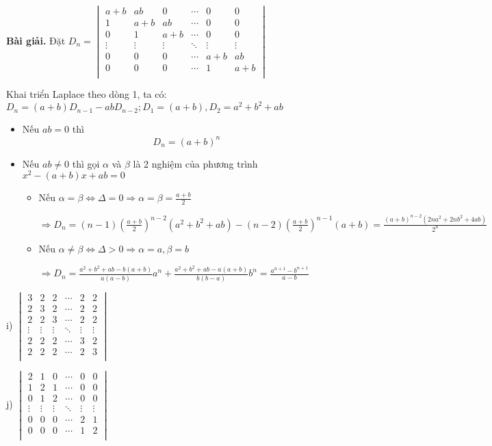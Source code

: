 \documentclass[12pt]{report}
\begin{document}
\textbf{Bài giải.} Đặt $D_n = \begin{vmatrix}
	a+b & ab & 0 & \cdots & 0 & 0 \\
	1 & a+b & ab & \cdots & 0 & 0 \\
	0 & 1 & a+b & \cdots & 0 & 0 \\
	\vdots & \vdots & \vdots & \ddots & \vdots & \vdots \\
	0 & 0 & 0 & \cdots & a+b & ab \\
	0 & 0 & 0 & \cdots & 1 & a+b \\
\end{vmatrix}$

Khai triển Laplace theo dòng 1, ta có: $D_n = (a+b)D_{n-1} - ab D_{n-2}; D_1 = (a+b), D_2 = a^2+b^2+ab$

\begin{itemize}
	\item Nếu $ab = 0$ thì \[ D_n = (a+b)^n \]
	\item Nếu $ab \neq 0$ thì gọi $\alpha$ và $\beta$ là 2 nghiệm của phương trình $x^2 - (a+b)x + ab = 0$
	\begin{itemize}
		\item Nếu $\alpha = \beta \Leftrightarrow \Delta = 0 \Rightarrow \alpha = \beta = \frac{a+b}{2}$ 
		
		$\Rightarrow D_n = (n-1) \left( \frac{a+b}{2} \right)^{n-2} (a^2+b^2+ab) - (n-2) \left(\frac{a+b}{2}\right)^{n-1} (a+b) = \frac{(a+b)^{n-2}(2na^2+2nb^2+4ab)}{2^n}$
		
		\item Nếu $\alpha \neq \beta \Leftrightarrow \Delta > 0 \Rightarrow \alpha = a, \beta = b$
		
		$\Rightarrow D_n = \frac{a^2+b^2+ab - b(a+b)}{a(a-b)} a^n + \frac{a^2+b^2+ab - a(a+b)}{b(b-a)} b^n = \frac{a^{n+1} - b^{n+1}}{a-b}$
	\end{itemize}
\end{itemize}

i) $\begin{vmatrix}
	3 & 2 & 2 & \cdots & 2 & 2 \\
	2 & 3 & 2 & \cdots & 2 & 2 \\
	2 & 2 & 3 & \cdots & 2 & 2 \\
	\vdots & \vdots & \vdots & \ddots & \vdots & \vdots \\
	2 & 2 & 2 & \cdots & 3 & 2 \\
	2 & 2 & 2 & \cdots & 2 & 3 \\
\end{vmatrix}$

j) $\begin{vmatrix}
	2 & 1 & 0 & \cdots & 0 & 0 \\
	1 & 2 & 1 & \cdots & 0 & 0 \\
	0 & 1 & 2 & \cdots & 0 & 0 \\
	\vdots & \vdots & \vdots & \ddots & \vdots & \vdots \\
	0 & 0 & 0 & \cdots & 2 & 1 \\
	0 & 0 & 0 & \cdots & 1 & 2 \\
\end{vmatrix}$
\end{document}

